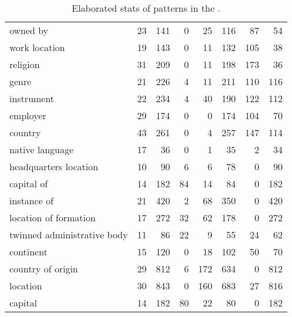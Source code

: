 \begin{table*}[t]
{\begin{tabular}{lrrrrrrr}
                             owned by &          23 &      141 &          0 &       25 &   116 &   87 &   54 \\
                        work location &          19 &      143 &          0 &       11 &   132 &  105 &   38 \\
                             religion &          31 &      209 &          0 &       11 &   198 &  173 &   36 \\
                                genre &          21 &      226 &          4 &       11 &   211 &  110 &  116 \\
                           instrument &          22 &      234 &          4 &       40 &   190 &  122 &  112 \\
                             employer &          29 &      174 &          0 &        0 &   174 &  104 &   70 \\
                              country &          43 &      261 &          0 &        4 &   257 &  147 &  114 \\
                      native language &          17 &       36 &          0 &        1 &    35 &    2 &   34 \\
                headquarters location &          10 &       90 &          6 &        6 &    78 &    0 &   90 \\
                           capital of &          14 &      182 &         84 &       14 &    84 &    0 &  182 \\
                          instance of &          21 &      420 &          2 &       68 &   350 &    0 &  420 \\
                location of formation &          17 &      272 &         32 &       62 &   178 &    0 &  272 \\
          twinned administrative body &          11 &       86 &         22 &        9 &    55 &   24 &   62 \\
                            continent &          15 &      120 &          0 &       18 &   102 &   50 &   70 \\
                    country of origin &          29 &      812 &          6 &      172 &   634 &    0 &  812 \\
                             location &          30 &      843 &          0 &      160 &   683 &   27 &  816 \\
                              capital &          14 &      182 &         80 &       22 &    80 &    0 &  182 \\
\bottomrule
\end{tabular}

}
    \caption{Elaborated stats of patterns in the \resource{}.}
    \label{tab:rel-graph-stats-elaborate}
\end{table*}